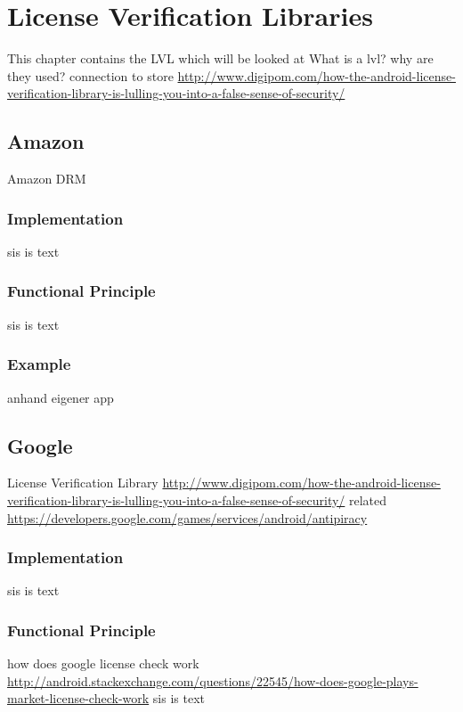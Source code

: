 \section{License Verification Libraries}\label{section:lvl}
This chapter contains the LVL which will be looked at\newline
What is a lvl? why are they used? connection to store\newline
\url{http://www.digipom.com/how-the-android-license-verification-library-is-lulling-you-into-a-false-sense-of-security/}\newline

\subsection{Amazon}\label{subsection:lvl-amazon}
Amazon DRM
\subsubsection{Implementation}\label{subsection:lvl-amazon-implementation}
sis is text
\subsubsection{Functional Principle}\label{subsection:lvl-amazon-functional}
sis is text
\subsubsection{Example}\label{subsection:lvl-amazon-example}
anhand eigener app
\subsection{Google}\label{subsection:lvl-google}
License Verification Library\newline
\url{http://www.digipom.com/how-the-android-license-verification-library-is-lulling-you-into-a-false-sense-of-security/}\newline
related \url{https://developers.google.com/games/services/android/antipiracy}
\subsubsection{Implementation}\label{subsection:lvl-google-implementation}
sis is text
\subsubsection{Functional Principle}\label{subsection:lvl-google-functional}
how does google license check work \url{http://android.stackexchange.com/questions/22545/how-does-google-plays-market-license-check-work}\newline
sis is text
